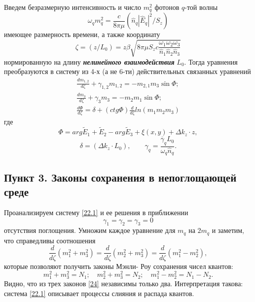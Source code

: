 \documentclass[a4paper]{article}
\begin{document}
 	Введем безразмерную интенсивность и число $m_{q}^{2}$ фотонов $q$-той волны 
 	\begin{equation}
 		\omega_{q}m_{q}^{2}=\frac{c}{8\pi\mu}(\hat{n}_{q}\left|\hat{E}_{q}\right|^{2}/S_{z})
 		\label{21.1}
 	\end{equation}
 	имеющее размерность времени, а также координату
 	\begin{equation}
 		\zeta=(z/L_{0})=z\beta\sqrt{8\pi\mu S_{z}c\frac{\omega_{1}\omega_{2}\omega_{3}}{\hat{n}_{1}\hat{n}_{2}\hat{n}_{3}}}
 		\tag{21'}\label{21'}
 	\end{equation}
 	нормированную на длину \textit{\textbf{нелинейного взаимодействия}} $L_{0}$. Тогда уравнения преобразуются в систему из 4-х  (а не 6-ти) действительных связанных уравнений 
 	\begin{equation}
 		\begin{aligned}
 			\frac{dm_{1,2}}{d\zeta}+\gamma_{1,2}m_{1,2}=-m_{2,1}m_{3}\sin\Phi;\\
 			\frac{dm_{3}}{d\zeta}+\gamma_{3}m_{3}=-m_{2}m_{1}\sin\Phi;\\
 			\frac{d\Phi}{d\zeta}=\delta+(ctg\Phi)\frac{d}{d\zeta}ln(m_{1}m_{2}m_{3})
 		\end{aligned}\label{22.1}
 	\end{equation}
 	где 
 	$$\Phi=arg\tilde{E}_{1}+\tilde{E}_{2}-arg\tilde{E}_{3}+\xi(x,y)+\Delta k_{z}\cdot z,$$
 	$$\delta=(\Delta k_{z}\cdot L_{0}),\qquad\gamma_{q}=\frac{\overline{\gamma}_{q}L_{0}}{\omega_{q}\hat{n}_{q}}.$$
 	\subsection*{Пункт 3. Законы сохранения в непоглощающей среде} 
 	
 	 Проанализируем систему \eqref{22.1} и ее решения в приближении
 		\begin{equation}
 			\gamma_{1}=\gamma_{2}=\gamma_{3}=0\label{23}
 		\end{equation} 		
 	отсутствия поглощения. Умножим каждое уравнение для $m_{q}$ на $2m_{q}$ и  заметим, что справедливы соотношения 
 	$$\frac{d}{d\zeta}(m_{1}^{2}+m_{3}^{2})=\frac{d}{d\zeta}(m_{2}^{2}+m_{3}^{2})=\frac{d}{d\zeta}(m_{1}^{2}-m_{2}^{2}),$$
 	которые позволяют получить законы Мэнли- Роу сохранения чисел квантов:
 	\begin{equation}
 		m_{1}^{2}+m_{3}^{2}=N_{1};\quad m_{2}^{2}+m_{3}^{2}=N_{2};\quad m_{1}^{2}-m_{2}^{2}=N_{1}-N_{2}.
 		\label{24}
 	\end{equation}
 	Видно, что из трех законов \eqref{24} независимы только два. Интерпретация такова: система \eqref{22.1} описывает процессы слияния и распада квантов. 
 	
\end{document}

